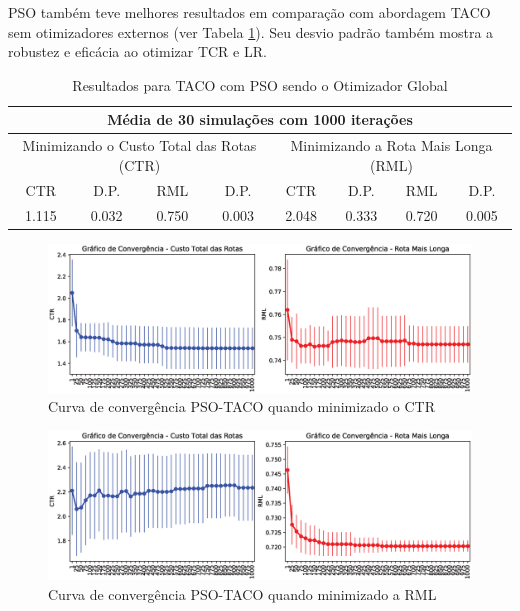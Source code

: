 PSO também teve melhores resultados em comparação com abordagem TACO sem otimizadores externos (ver Tabela \ref{tab:resultado-psotaco}). Seu desvio padrão também mostra a robustez e eficácia ao otimizar TCR e LR.

\begin{table}[htb]
    \centering
    \caption{Resultados para TACO com PSO sendo o Otimizador Global} \label{tab:resultado-psotaco}
\begin{tabular}{|c|c|c|c|c|c|c|c|}
\hline
\multicolumn{8}{|c|}{Média de 30 simulações com 1000 iterações}                                                            \\ \hline
\multicolumn{4}{|c|}{Minimizando o Custo Total das Rotas (CTR)} & \multicolumn{4}{c|}{Minimizando a Rota Mais Longa (RML)} \\ \hline
CTR            & D.P.           & RML           & D.P.          & CTR          & D.P.         & RML          & D.P.        \\ \hline
1.115          & 0.032          & 0.750         & 0.003         & 2.048        & 0.333        & 0.720        & 0.005       \\ \hline
\end{tabular}
\end{table}

\begin{figure}[htb]
    \centering
    \includegraphics[width=\textwidth]{imagens/convergence-totalcost-psotaco.eps}
    \caption{Curva de convergência PSO-TACO quando minimizado o CTR} \label{fig:resultados-convergencia-pso-tcr}
\end{figure}

\begin{figure}[htb]
    \centering
    \includegraphics[width=\textwidth]{imagens/convergence-maxcost-psotaco.eps}
    \caption{Curva de convergência PSO-TACO quando minimizado a RML} \label{fig:resultados-convergencia-pso-rml}
\end{figure}

